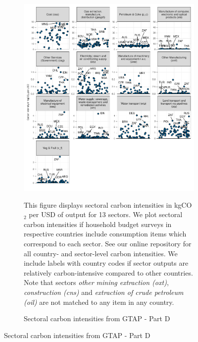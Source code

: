 \begin{figure}[ht!]\ContinuedFloat
\begin{subfigure}[b]{\textwidth}
  \centering
  \includegraphics{Analysis_Carbon_Intensities_GTAP/Figure_2.1.1_D_2017B.pdf}
  \caption{Sectoral carbon intensities from GTAP - Part D} \label{fig:B4}  
  \begin{subcaption2}
    This figure displays sectoral carbon intensities in kgCO$_{2}$ per USD of output for 13 sectors. We plot sectoral carbon intensities if household budget surveys in respective countries include consumption items which correspond to each sector. See our online repository for all country- and sector-level carbon intensities. We include labels with country codes if sector outputs are relatively carbon-intensive compared to other countries. Note that sectors \textit{other mining extraction (oxt)}, \textit{construction (cns)} and \textit{extraction of crude petroleum (oil)} are not matched to any item in any country.
  \end{subcaption2}
\end{subfigure}
\end{figure}

\clearpage